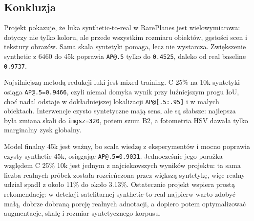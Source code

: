 \documentclass[
  11pt,
]{article}
\begin{document}
\hypertarget{konkluzja}{%
\subsection{Konkluzja}\label{konkluzja}}

Projekt pokazuje, że luka synthetic-to-real w RarePlanes jest
wielowymiarowa: dotyczy nie tylko koloru, ale przede wszystkim rozmiaru
obiektów, gęstości scen i tekstury obrazów. Sama skala syntetyki pomaga,
lecz nie wystarcza. Zwiększenie synthetic z 6460 do 45k poprawia
\texttt{AP@.5} tylko do \texttt{0.4525}, daleko od real baseline
\texttt{0.9737}.

Najsilniejszą metodą redukcji luki jest mixed training. C 25\% na 10k
syntetyki osiąga \texttt{AP@.5=0.9466}, czyli niemal domyka wynik przy
luźniejszym progu IoU, choć nadal odstaje w dokładniejszej lokalizacji
\texttt{AP@{[}.5:.95{]}} i w małych obiektach. Interwencje czysto
syntetyczne mają sens, ale są słabsze: najlepsza była zmiana skali do
\texttt{imgsz=320}, potem szum B2, a fotometria HSV dawała tylko
marginalny zysk globalny.

Model finalny 45k jest ważny, bo scala wiedzę z eksperymentów i mocno
poprawia czysty synthetic 45k, osiągając \texttt{AP@.5=0.9031}.
Jednocześnie jego porażka względem C 25\% 10k jest jednym z
najciekawszych wyników projektu: ta sama liczba realnych próbek została
rozcieńczona przez większą syntetykę, więc realny udział spadł z około
11\% do około 3.13\%. Ostatecznie projekt wspiera prostą rekomendację: w
detekcji satelitarnej synthetic-to-real najpierw warto zdobyć małą,
dobrze dobraną porcję realnych adnotacji, a dopiero potem optymalizować
augmentacje, skalę i rozmiar syntetycznego korpusu.
\end{document}
